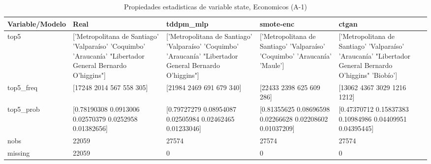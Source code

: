 \begin{table}[H]
\centering
\fontsize{8}{14}\selectfont
\caption{Propiedades  estadisticas de variable state, Economicos (A-1)}
\label{table-stats-economicos-a-1-state}
\begin{tabular}{|l|m{10em}|m{10em}|m{10em}|m{10em}|}
\hline
 \rowcolor[gray]{0.8}
Variable/Modelo & Real & tddpm\_mlp & smote-enc & ctgan \\
\hline top5 & ['Metropolitana de Santiago' 'Valparaíso' 'Coquimbo' 'Araucanía'
 "Libertador General Bernardo O'higgins"] & ['Metropolitana de Santiago' 'Valparaíso' 'Coquimbo' 'Araucanía'
 "Libertador General Bernardo O'higgins"] & ['Metropolitana de Santiago' 'Valparaíso' 'Coquimbo' 'Araucanía' 'Maule'] & ['Metropolitana de Santiago' 'Valparaíso' 'Araucanía'
 "Libertador General Bernardo O'higgins" 'Biobío'] \\
\hline top5\_freq & [17248  2014   567   558   305] & [21984  2469   691   679   340] & [22433  2398   625   609   286] & [13062  4367  3029  1216  1212] \\
\hline top5\_prob & [0.78190308 0.0913006  0.02570379 0.0252958  0.01382656] & [0.79727279 0.08954087 0.02505984 0.02462465 0.01233046] & [0.81355625 0.08696598 0.02266628 0.02208602 0.01037209] & [0.47370712 0.15837383 0.10984986 0.04409951 0.04395445] \\
\hline nobs & 22059 & 27574 & 27574 & 27574 \\
\hline missing & 22059 & 0 & 0 & 0 \\
\hline
\end{tabular}
\end{table}
